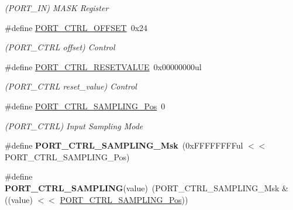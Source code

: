 \begin{DoxyCompactItemize}
\begin{DoxyCompactList}\small\item\em (P\+O\+R\+T\+\_\+\+I\+N) M\+A\+S\+K Register \end{DoxyCompactList}\item 
\hypertarget{group___s_a_m_l21___p_o_r_t_ga3a53a2a2a7695aa20f7827ceafcec8d5}{}\#define \hyperlink{group___s_a_m_l21___p_o_r_t_ga3a53a2a2a7695aa20f7827ceafcec8d5}{P\+O\+R\+T\+\_\+\+C\+T\+R\+L\+\_\+\+O\+F\+F\+S\+E\+T}~0x24\label{group___s_a_m_l21___p_o_r_t_ga3a53a2a2a7695aa20f7827ceafcec8d5}

\begin{DoxyCompactList}\small\item\em (P\+O\+R\+T\+\_\+\+C\+T\+R\+L offset) Control \end{DoxyCompactList}\item 
\hypertarget{group___s_a_m_l21___p_o_r_t_ga24912324fee45dc65e6d91dce8b908c3}{}\#define \hyperlink{group___s_a_m_l21___p_o_r_t_ga24912324fee45dc65e6d91dce8b908c3}{P\+O\+R\+T\+\_\+\+C\+T\+R\+L\+\_\+\+R\+E\+S\+E\+T\+V\+A\+L\+U\+E}~0x00000000ul\label{group___s_a_m_l21___p_o_r_t_ga24912324fee45dc65e6d91dce8b908c3}

\begin{DoxyCompactList}\small\item\em (P\+O\+R\+T\+\_\+\+C\+T\+R\+L reset\+\_\+value) Control \end{DoxyCompactList}\item 
\hypertarget{group___s_a_m_l21___p_o_r_t_gaf27535115d3c255e443dbe76e1e1a03c}{}\#define \hyperlink{group___s_a_m_l21___p_o_r_t_gaf27535115d3c255e443dbe76e1e1a03c}{P\+O\+R\+T\+\_\+\+C\+T\+R\+L\+\_\+\+S\+A\+M\+P\+L\+I\+N\+G\+\_\+\+Pos}~0\label{group___s_a_m_l21___p_o_r_t_gaf27535115d3c255e443dbe76e1e1a03c}

\begin{DoxyCompactList}\small\item\em (P\+O\+R\+T\+\_\+\+C\+T\+R\+L) Input Sampling Mode \end{DoxyCompactList}\item 
\hypertarget{group___s_a_m_l21___p_o_r_t_ga1ca0c4a14f1f5fdcecb663287a093638}{}\#define {\bfseries P\+O\+R\+T\+\_\+\+C\+T\+R\+L\+\_\+\+S\+A\+M\+P\+L\+I\+N\+G\+\_\+\+Msk}~(0x\+F\+F\+F\+F\+F\+F\+F\+Ful $<$$<$ P\+O\+R\+T\+\_\+\+C\+T\+R\+L\+\_\+\+S\+A\+M\+P\+L\+I\+N\+G\+\_\+\+Pos)\label{group___s_a_m_l21___p_o_r_t_ga1ca0c4a14f1f5fdcecb663287a093638}

\item 
\hypertarget{group___s_a_m_l21___p_o_r_t_ga8992de32f5013d24b45021d6e972ff87}{}\#define {\bfseries P\+O\+R\+T\+\_\+\+C\+T\+R\+L\+\_\+\+S\+A\+M\+P\+L\+I\+N\+G}(value)~(P\+O\+R\+T\+\_\+\+C\+T\+R\+L\+\_\+\+S\+A\+M\+P\+L\+I\+N\+G\+\_\+\+Msk \& ((value) $<$$<$ \hyperlink{group___s_a_m_l21___p_o_r_t_gaf27535115d3c255e443dbe76e1e1a03c}{P\+O\+R\+T\+\_\+\+C\+T\+R\+L\+\_\+\+S\+A\+M\+P\+L\+I\+N\+G\+\_\+\+Pos}))\label{group___s_a_m_l21___p_o_r_t_ga8992de32f5013d24b45021d6e972ff87}


\end{DoxyCompactItemize}
